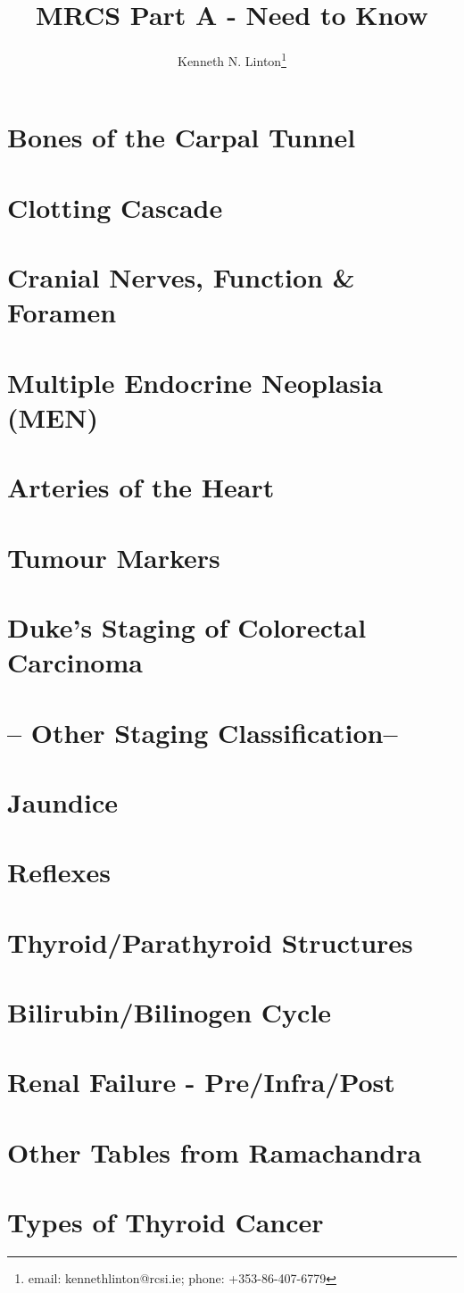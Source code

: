 \documentclass[12pt, a4paper]{article}
\title{MRCS Part A - Need to Know}
\author{Kenneth N. Linton\thanks{email: kennethlinton@rcsi.ie; phone: +353-86-407-6779}}
\begin{document}
\maketitle

\section{Bones of the Carpal Tunnel}
\section{Clotting Cascade}
\section{Cranial Nerves, Function & Foramen}
\section{Multiple Endocrine Neoplasia (MEN)}
\section{Arteries of the Heart}
\section{Tumour Markers}
\section{Duke's Staging of Colorectal Carcinoma}
\section{-- Other Staging Classification--}
\section{Jaundice}
\section{Reflexes}
\section{Thyroid/Parathyroid Structures}
\section{Bilirubin/Bilinogen Cycle}
\section{Renal Failure - Pre/Infra/Post}
\section{Other Tables from Ramachandra}
\section{Types of Thyroid Cancer}

\end{document}
